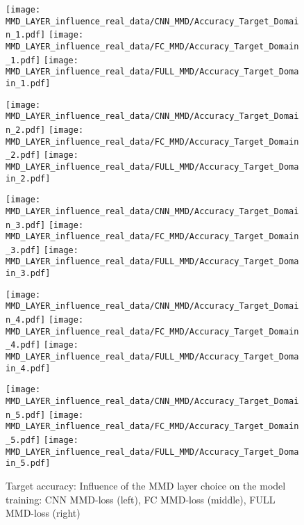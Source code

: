 \begin{figure}[H]
  \centering

  \texttt{[image: MMD\_LAYER\_influence\_real\_data/CNN\_MMD/Accuracy\_Target\_Domain\_1.pdf]}
  \hspace{.1cm}
  \texttt{[image: MMD\_LAYER\_influence\_real\_data/FC\_MMD/Accuracy\_Target\_Domain\_1.pdf]}
  \hspace{.1cm}
  \texttt{[image: MMD\_LAYER\_influence\_real\_data/FULL\_MMD/Accuracy\_Target\_Domain\_1.pdf]}

  \vspace{.3cm}

  \texttt{[image: MMD\_LAYER\_influence\_real\_data/CNN\_MMD/Accuracy\_Target\_Domain\_2.pdf]}
  \hspace{.1cm}
  \texttt{[image: MMD\_LAYER\_influence\_real\_data/FC\_MMD/Accuracy\_Target\_Domain\_2.pdf]}
  \hspace{.1cm}
  \texttt{[image: MMD\_LAYER\_influence\_real\_data/FULL\_MMD/Accuracy\_Target\_Domain\_2.pdf]}

  \vspace{.3cm}

  \texttt{[image: MMD\_LAYER\_influence\_real\_data/CNN\_MMD/Accuracy\_Target\_Domain\_3.pdf]}
  \hspace{.1cm}
  \texttt{[image: MMD\_LAYER\_influence\_real\_data/FC\_MMD/Accuracy\_Target\_Domain\_3.pdf]}
  \hspace{.1cm}
  \texttt{[image: MMD\_LAYER\_influence\_real\_data/FULL\_MMD/Accuracy\_Target\_Domain\_3.pdf]}
  
    \vspace{.3cm}

  \texttt{[image: MMD\_LAYER\_influence\_real\_data/CNN\_MMD/Accuracy\_Target\_Domain\_4.pdf]}
  \hspace{.1cm}
  \texttt{[image: MMD\_LAYER\_influence\_real\_data/FC\_MMD/Accuracy\_Target\_Domain\_4.pdf]}
  \hspace{.1cm}
  \texttt{[image: MMD\_LAYER\_influence\_real\_data/FULL\_MMD/Accuracy\_Target\_Domain\_4.pdf]}
  
    \vspace{.3cm}
    
  \texttt{[image: MMD\_LAYER\_influence\_real\_data/CNN\_MMD/Accuracy\_Target\_Domain\_5.pdf]}
  \hspace{.1cm}
  \texttt{[image: MMD\_LAYER\_influence\_real\_data/FC\_MMD/Accuracy\_Target\_Domain\_5.pdf]}
  \hspace{.1cm}
  \texttt{[image: MMD\_LAYER\_influence\_real\_data/FULL\_MMD/Accuracy\_Target\_Domain\_5.pdf]}


  \caption{Target accuracy: Influence of the MMD layer choice on the model training: CNN MMD-loss (left), FC MMD-loss (middle), FULL MMD-loss (right)}
  \label{fig:target_accuracy_MMD_layer}
\end{figure}


